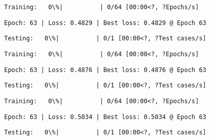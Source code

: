 \documentclass[11pt]{article}
\begin{document}
    
    
    \begin{Verbatim}[commandchars=\\\{\}]
Training:   0\%|          | 0/64 [00:00<?, ?Epochs/s]
    \end{Verbatim}

    
    \begin{Verbatim}[commandchars=\\\{\}]
Epoch: 63 | Loss: 0.4829 | Best loss: 0.4829 @ Epoch 63
    \end{Verbatim}

    
    \begin{Verbatim}[commandchars=\\\{\}]
Testing:   0\%|          | 0/1 [00:00<?, ?Test cases/s]
    \end{Verbatim}

    
    
    \begin{Verbatim}[commandchars=\\\{\}]
Training:   0\%|          | 0/64 [00:00<?, ?Epochs/s]
    \end{Verbatim}

    
    \begin{Verbatim}[commandchars=\\\{\}]
Epoch: 63 | Loss: 0.4876 | Best loss: 0.4876 @ Epoch 63
    \end{Verbatim}

    
    \begin{Verbatim}[commandchars=\\\{\}]
Testing:   0\%|          | 0/1 [00:00<?, ?Test cases/s]
    \end{Verbatim}

    
    
    \begin{Verbatim}[commandchars=\\\{\}]
Training:   0\%|          | 0/64 [00:00<?, ?Epochs/s]
    \end{Verbatim}

    
    \begin{Verbatim}[commandchars=\\\{\}]
Epoch: 63 | Loss: 0.5034 | Best loss: 0.5034 @ Epoch 63
    \end{Verbatim}

    
    \begin{Verbatim}[commandchars=\\\{\}]
Testing:   0\%|          | 0/1 [00:00<?, ?Test cases/s]
    \end{Verbatim}
\end{document}
